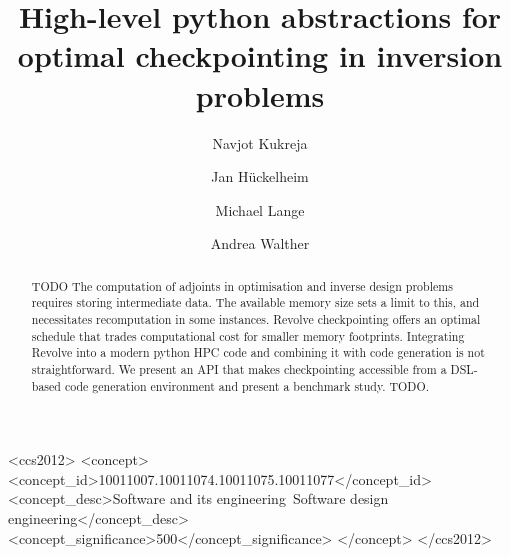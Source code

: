 \documentclass[sigconf]{acmart}
\begin{document}
\title{High-level python abstractions for optimal checkpointing in inversion problems}


\author{Navjot Kukreja}
\author{Jan H\"uckelheim}
\author{Michael Lange}
\author{Andrea Walther}

\renewcommand\shortauthors{Kukreja, N. et al}

\begin{abstract} TODO
The computation of adjoints in optimisation and inverse design problems requires storing
intermediate data. The available memory size sets a limit to this, and necessitates recomputation in
some instances. Revolve checkpointing offers an optimal schedule that trades computational cost for
smaller memory footprints. Integrating Revolve into a modern python HPC code and combining it with
code generation is not straightforward. We present an API that makes checkpointing accessible from a
DSL-based code generation environment and present a benchmark study. TODO.
\end{abstract}

%
%
\begin{CCSXML}
<ccs2012>
<concept>
<concept_id>10011007.10011074.10011075.10011077</concept_id>
<concept_desc>Software and its engineering~Software design engineering</concept_desc>
<concept_significance>500</concept_significance>
</concept>
</ccs2012>
\end{CCSXML}

%
%




\maketitle
\end{document}
